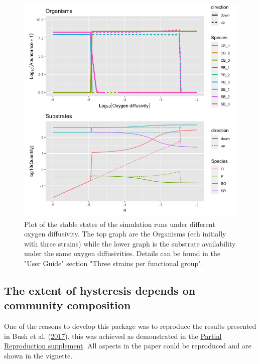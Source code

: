 \documentclass[]{elsarticle} %
\begin{document}
\begin{figure}

{\centering \includegraphics[width=500px]{figures/ug_three_strains_stable_state} 

}

\caption{Plot of the stable states of the simulation runs under different oxygen diffusivity. The top graph are the Organisms (ech initially with three strains) while the lower graph is the substrate availability under the same oxygen diffusivities. Details can be found in the "User Guide" section "Three strains per functional group".}\label{fig:uc1_stable_state}
\end{figure}

\hypertarget{the-extent-of-hysteresis-depends-on-community-composition}{%
\subsection{The extent of hysteresis depends on community
composition}\label{the-extent-of-hysteresis-depends-on-community-composition}}

One of the reasons to develop this package was to reproduce the results
presented in Bush et al. (\protect\hyperlink{ref-Bush2017}{2017}), this
was achieved as demonstrated in the \href{LINK_NEEDED}{Partial
Reproduction supplement}. All aspects in the paper could be reproduced
and are shown in the vignette.
\end{document}
